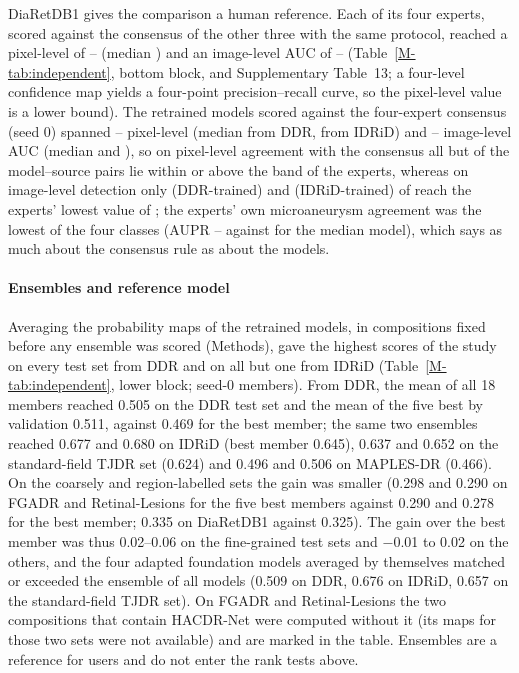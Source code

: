 DiaRetDB1 gives the comparison a human reference. Each of its four experts, scored against the consensus of the other three with the same protocol, reached a pixel-level \mAUPR{} of -- (median ) and an image-level AUC of -- (Table~\ref{M-tab:independent}, bottom block, and Supplementary Table~13; a four-level confidence map yields a four-point precision--recall curve, so the pixel-level value is a lower bound). The retrained models scored against the four-expert consensus (seed 0) spanned -- pixel-level \mAUPR{} (median  from DDR,  from IDRiD) and -- image-level AUC (median  and ), so on pixel-level agreement with the consensus all but  of the  model--source pairs lie within or above the band of the experts, whereas on image-level detection only  (DDR-trained) and  (IDRiD-trained) of  reach the experts' lowest value of ; the experts' own microaneurysm agreement was the lowest of the four classes (AUPR -- against  for the median model), which says as much about the consensus rule as about the models.

\paragraph{Ensembles and reference model}

Averaging the probability maps of the retrained models, in compositions fixed before any ensemble was scored (Methods), gave the highest scores of the study on every test set from DDR and on all but one from IDRiD (Table~\ref{M-tab:independent}, lower block; seed-0 members). From DDR, the mean of all 18 members reached 0.505 on the DDR test set and the mean of the five best by validation \mAUPR{} 0.511, against 0.469 for the best member; the same two ensembles reached 0.677 and 0.680 on IDRiD (best member 0.645), 0.637 and 0.652 on the standard-field TJDR set (0.624) and 0.496 and 0.506 on MAPLES-DR (0.466). On the coarsely and region-labelled sets the gain was smaller (0.298 and 0.290 on FGADR and Retinal-Lesions for the five best members against 0.290 and 0.278 for the best member; 0.335 on DiaRetDB1 against 0.325). The gain over the best member was thus 0.02--0.06 \mAUPR{} on the fine-grained test sets and $-$0.01 to 0.02 on the others, and the four adapted foundation models averaged by themselves matched or exceeded the ensemble of all models (0.509 on DDR, 0.676 on IDRiD, 0.657 on the standard-field TJDR set). On FGADR and Retinal-Lesions the two compositions that contain HACDR-Net were computed without it (its maps for those two sets were not available) and are marked in the table. Ensembles are a reference for users and do not enter the rank tests above.

